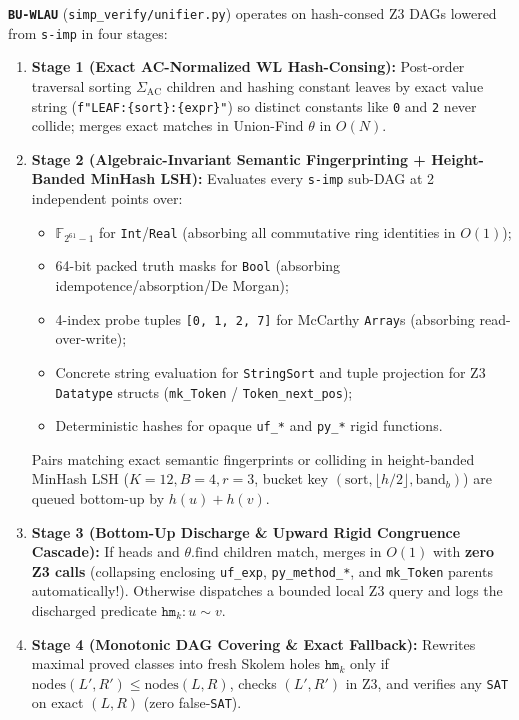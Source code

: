 \documentclass[11pt,a4paper]{article}
\begin{document}
\textbf{\texttt{BU-WLAU}} (\texttt{simp\_verify/unifier.py}) operates on hash-consed Z3 DAGs lowered from \texttt{s-imp} in four stages:
\begin{enumerate}
  \item \textbf{Stage 1 (Exact AC-Normalized WL Hash-Consing):} Post-order traversal sorting $\Sigma_{\text{AC}}$ children and hashing constant leaves by exact value string (\texttt{f"LEAF:\{sort\}:\{expr\}"}) so distinct constants like \texttt{0} and \texttt{2} never collide; merges exact matches in Union-Find $\theta$ in $O(N)$.
  \item \textbf{Stage 2 (Algebraic-Invariant Semantic Fingerprinting + Height-Banded MinHash LSH):} Evaluates every \texttt{s-imp} sub-DAG at 2 independent points over:
  \begin{itemize}
    \item $\mathbb{F}_{2^{61}-1}$ for \texttt{Int}/\texttt{Real} (absorbing all commutative ring identities in $O(1)$);
    \item 64-bit packed truth masks for \texttt{Bool} (absorbing idempotence/absorption/De Morgan);
    \item 4-index probe tuples \texttt{[0, 1, 2, 7]} for McCarthy \texttt{Array}s (absorbing read-over-write);
    \item Concrete string evaluation for \texttt{StringSort} and tuple projection for Z3 \texttt{Datatype} structs (\texttt{mk\_Token} / \texttt{Token\_next\_pos});
    \item Deterministic hashes for opaque \texttt{uf\_*} and \texttt{py\_*} rigid functions.
  \end{itemize}
  Pairs matching exact semantic fingerprints or colliding in height-banded MinHash LSH ($K=12, B=4, r=3$, bucket key $(\mathrm{sort}, \lfloor h/2 \rfloor, \mathrm{band}_b)$) are queued bottom-up by $h(u)+h(v)$.
  \item \textbf{Stage 3 (Bottom-Up Discharge \& Upward Rigid Congruence Cascade):} If heads and $\theta.\mathrm{find}$ children match, merges in $O(1)$ with \textbf{zero Z3 calls} (collapsing enclosing \texttt{uf\_exp}, \texttt{py\_method\_*}, and \texttt{mk\_Token} parents automatically!). Otherwise dispatches a bounded local Z3 query and logs the discharged predicate $\texttt{hm}_k : u \sim v$.
  \item \textbf{Stage 4 (Monotonic DAG Covering \& Exact Fallback):} Rewrites maximal proved classes into fresh Skolem holes $\texttt{hm}_k$ only if $\mathrm{nodes}(L', R') \le \mathrm{nodes}(L, R)$, checks $(L', R')$ in Z3, and verifies any \texttt{SAT} on exact $(L, R)$ (zero false-\texttt{SAT}).
\end{enumerate}
\end{document}
